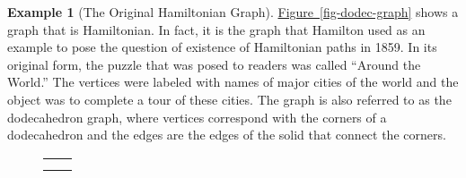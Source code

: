 \documentclass[10pt,]{book}
\theoremstyle{plain}
\theoremstyle{definition}
\theoremstyle{definition}
\theoremstyle{definition}
\newtheorem{example}[theorem]{Example}
\theoremstyle{definition}
\theoremstyle{definition}
\numberwithin{equation}{section}
\newlength{\panelmax}
\begin{document}
\begin{example}[The Original Hamiltonian Graph]\label{ex-dodec-graph}
\hyperref[fig-dodec-graph]{Figure~\ref{fig-dodec-graph}} shows a graph that is Hamiltonian. In fact, it is the graph that Hamilton used as an example to pose the question of existence of Hamiltonian paths in 1859. In its original form, the puzzle that was posed to readers was called ``Around the World.'' The vertices were labeled with names of major cities of the world and the object was to complete a tour of these cities. The graph is also referred to as the
dodecahedron graph, where vertices correspond with the corners of a dodecahedron and the edges are the edges of the solid that connect the corners.%
{%
\setlength{\panelmax}{0pt}
\newsavebox{\panelboxVimage}
\newlength{\phVimage}\setlength{\phVimage}{\ht\panelboxVimage+\dp\panelboxVimage}
\settototalheight{\phVimage}{\usebox{\panelboxVimage}}
\setlength{\panelmax}{\maxof{\panelmax}{\phVimage}}
\newsavebox{\panelboxWimage}
\newlength{\phWimage}\setlength{\phWimage}{\ht\panelboxWimage+\dp\panelboxWimage}
\settototalheight{\phWimage}{\usebox{\panelboxWimage}}
\setlength{\panelmax}{\maxof{\panelmax}{\phWimage}}
\leavevmode%
\setlength{\tabcolsep}{0\textwidth}
\begin{figure}
\begin{tabular}{@{}*{2}{c}@{}}
\begin{minipage}[c][\panelmax][t]{0.5\textwidth}\usebox{\panelboxVimage}\end{minipage}&
\begin{minipage}[c][\panelmax][t]{0.5\textwidth}\usebox{\panelboxWimage}\end{minipage}\tabularnewline
\parbox[t]{0.5\textwidth}{
}&
\parbox[t]{0.5\textwidth}{
}\end{tabular}
\end{figure}
}%
\end{example}
\end{document}
